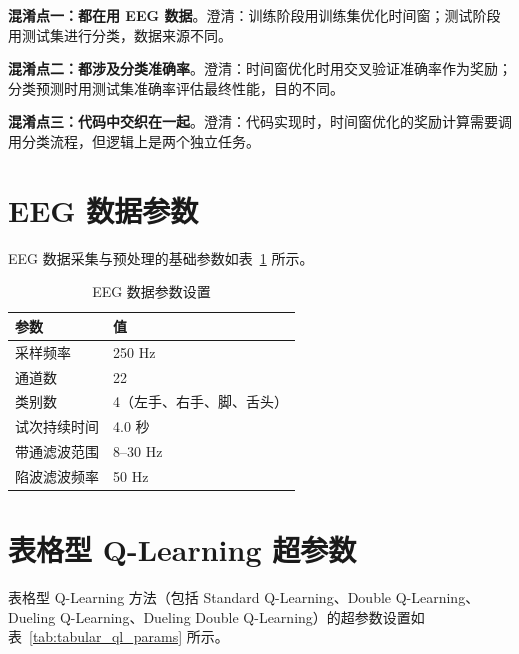 \textbf{混淆点一：都在用 EEG 数据}。澄清：训练阶段用训练集优化时间窗；测试阶段用测试集进行分类，数据来源不同。

\textbf{混淆点二：都涉及分类准确率}。澄清：时间窗优化时用交叉验证准确率作为奖励；分类预测时用测试集准确率评估最终性能，目的不同。

\textbf{混淆点三：代码中交织在一起}。澄清：代码实现时，时间窗优化的奖励计算需要调用分类流程，但逻辑上是两个独立任务。

\section{EEG 数据参数}
\label{sec:eeg_params}

EEG 数据采集与预处理的基础参数如表~\ref{tab:eeg_params} 所示。

\begin{table}[H]
\centering
\caption{EEG 数据参数设置}
\label{tab:eeg_params}
\begin{tabular}{ll}
\hline
\textbf{参数} & \textbf{值} \\
\hline
采样频率 & 250 Hz \\
通道数 & 22 \\
类别数 & 4（左手、右手、脚、舌头） \\
试次持续时间 & 4.0 秒 \\
带通滤波范围 & 8--30 Hz \\
陷波滤波频率 & 50 Hz \\
\hline
\end{tabular}
\end{table}

\section{表格型 Q-Learning 超参数}
\label{sec:tabular_ql_params}

表格型 Q-Learning 方法（包括 Standard Q-Learning、Double Q-Learning、Dueling Q-Learning、Dueling Double Q-Learning）的超参数设置如表~\ref{tab:tabular_ql_params} 所示。

